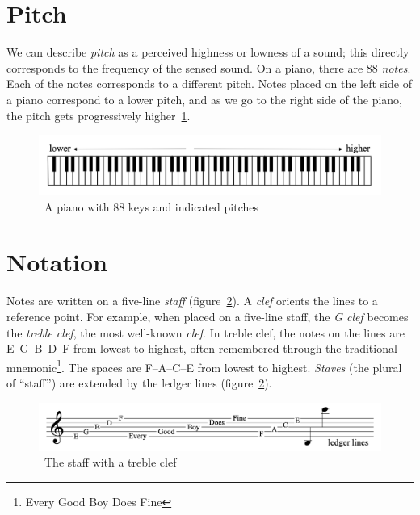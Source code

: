 \section{Pitch}\label{sec:pitch}

We can describe \textit{pitch} as a perceived highness or lowness of a sound;
this directly corresponds to the frequency of the sensed sound.
On a piano, there are 88 \textit{notes}.
Each of the notes corresponds to a different pitch.
Notes placed on the left side of a piano correspond to a lower pitch, and as we go to the right side of the piano, the pitch gets progressively higher~\ref{fig:piano}.~\cite{music-theory}

\begin{figure}
    \centering
    \includegraphics[width=\textwidth]{assets/piano}
    \caption{~A piano with 88 keys and indicated pitches~\cite{music-theory}}\label{fig:piano}
\end{figure}


\section{Notation}\label{sec:notation}

Notes are written on a five-line \textit{staff} (figure~\ref{fig:staff}).
A \textit{clef} orients the lines to a reference point.
For example, when placed on a five-line staff, the \textit{G clef} becomes the \textit{treble clef}, the most well-known \textit{clef}.
In treble clef, the notes on the lines are E--G--B--D--F from lowest to highest, often remembered through the traditional mnemonic\footnote{Every Good Boy Does Fine}.
The spaces are F--A--C--E from lowest to highest.
\textit{Staves} (the plural of ``staff'') are extended by the ledger lines (figure~\ref{fig:staff}).~\cite{music-theory}


\begin{figure}
    \centering
    \includegraphics[width=\textwidth]{assets/staff}
    \caption{~The staff with a treble clef~\cite{music-theory}}\label{fig:staff}
\end{figure}


